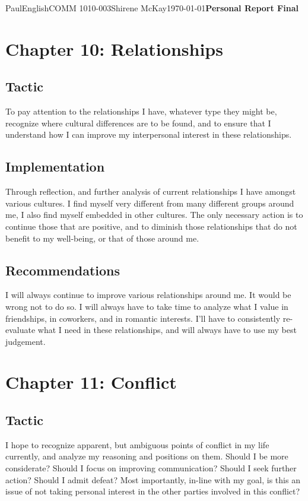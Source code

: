 \documentclass[12pt,letterpaper]{article}
\begin{document}
\begin{mla}{Paul}{English}{COMM 1010-003}{Shirene
    McKay}{\today}{\textbf{Personal Report Final}}
\section{Chapter 10: Relationships}


\subsection{Tactic}

To pay attention to the relationships I have, whatever type they might be, recognize where cultural differences are to be found, and to ensure that I understand how I can improve my interpersonal interest in these relationships.

\subsection{Implementation}

Through reflection, and further analysis of current relationships I have amongst various cultures. I find myself very different from many different groups around me, I also find myself embedded in other cultures. The only necessary action is to continue those that are positive, and to diminish those relationships that do not benefit to my well-being, or that of those around me.

\subsection{Recommendations}

I will always continue to improve various relationships around me. It would be wrong not to do so. I will always have to take time to analyze what I value in friendships, in coworkers, and in romantic interests. I'll have to consistently re-evaluate what I need in these relationships, and will always have to use my best judgement.

\section{Chapter 11: Conflict}

\subsection{Tactic}

I hope to recognize apparent, but ambiguous points of conflict in my life currently, and analyze my reasoning and positions on them. Should I be more considerate? Should I focus on improving communication? Should I seek further action? Should I admit defeat? Most importantly, in-line with my goal, is this an issue of not taking personal interest in the other parties involved in this conflict?


\end{mla}
\end{document}
